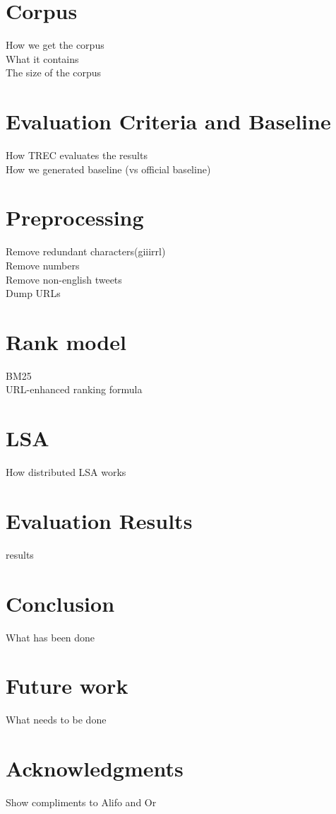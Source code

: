 \documentclass{acm_proc_article-sp}
\begin{document}
\section{Corpus}
How we get the corpus\\
What it contains\\
The size of the corpus\\

\section{Evaluation Criteria and Baseline}
How TREC evaluates the results\\
How we generated baseline (vs official baseline)\\

\section{Preprocessing}
Remove redundant characters(giiirrl)\\
Remove numbers\\
Remove non-english tweets\\
Dump URLs\\

\section{Rank model}
BM25\\
URL-enhanced ranking formula

\section{LSA}
How distributed LSA works\\

\section{Evaluation Results}
results\\

\section{Conclusion}
What has been done 

\section{Future work}
What needs to be done

\section{Acknowledgments}
Show compliments to Alifo and Or\\  



\balancecolumns
\end{document}
